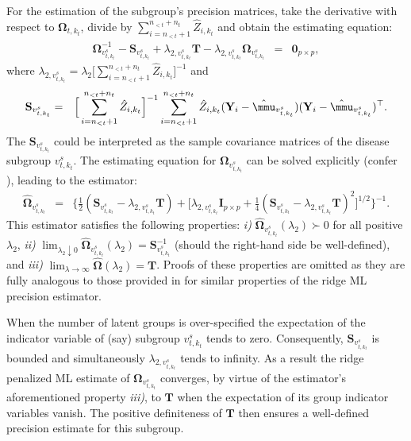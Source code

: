 \documentclass[10pt]{article}
\begin{document}
For the estimation of the subgroup's precision matrices, take the derivative with respect to $\mathbf{\Omega}_{t,k_t}$, divide by $\sum_{i=n_{<t} + 1}^{n_{<t} + n_t} \hat{Z}_{i, k_t} $ and obtain the estimating equation:
\begin{eqnarray*}
\mathbf{\Omega}_{v_{t, k_t}^s}^{-1} - \mathbf{S}_{v_{t, k_t}^s} + \lambda_{2, v_{t, k_t}^s} \mathbf{T} - \lambda_{2, v_{t, k_t}^s} \mathbf{\Omega}_{v_{t, k_t}^s} & = & \mathbf{0}_{p \times p},
\end{eqnarray*}
where  $\lambda_{2, v_{t, k_t}^s} = \lambda_2 \big[ \sum_{i=n_{<t} + 1}^{n_{<t} + n_t} \hat{Z}_{i, k_t}  \big]^{-1}$ and
\begin{eqnarray*}
\mathbf{S}_{v_{t, k_t}^s} & = & \Big[  \sum_{i=n_{<t} + 1}^{n_{<t} + n_t} \hat{Z}_{i, k_t}  \Big]^{-1}  \sum_{i=n_{<t} + 1}^{n_{<t} + n_t} \hat{Z}_{i, k_t}  (\mathbf{Y}_i - \hat{\mmu}_{v_{t, k_t}^s}) (\mathbf{Y}_{i} - \hat{\mmu}_{v_{t, k_t}^s})^{\top}.
\end{eqnarray*}
The $\mathbf{S}_{v_{t, k_t}^s}$ could be interpreted as the sample covariance matrices of the disease subgroup $v_{t, k_t}^s$. The estimating equation for $\mathbf{\Omega}_{v_{t, k_t}^s}$ can be solved explicitly (confer \citealp{VWie2014b}), leading to the estimator:
\begin{eqnarray}
\widehat{\mathbf{\Omega}}_{v_{t, k_t}^s} & = & \Big\{ \frac{1}{2} ( \mathbf{S}_{v_{t, k_t}^s}  - \lambda_{2, v_{t, k_t}^s} \mathbf{T} ) + \Big[\lambda_{2, v_{t, k_t}^s} \mathbf{I}_{p \times p} + \frac{1}{4} (\mathbf{S}_{v_{t, k_t}^s} - \lambda_{2,v_{t, k_t}^s} \mathbf{T})^2 \Big]^{1/2}  \Big\}^{-1}.
\label{est:omega}
\end{eqnarray}
This estimator satisfies the following properties: \textit{i)} $\widehat{\mathbf{\Omega}}_{v_{t, k_t}^s}(\lambda_2) \succ 0$ for all positive $\lambda_2$, \textit{ii)} $\lim_{\lambda_2 \downarrow 0}  \widehat{\mathbf{\Omega}}_{v_{t, k_t}^s} (\lambda_2) = \mathbf{S}_{v_{t, k_t}^s}^{-1}$ (should the right-hand side be well-defined), and \textit{iii)} $\lim_{\lambda\rightarrow \infty} \widehat{\mathbf{\Omega}}(\lambda_2)= \mathbf{T}$. Proofs of these properties are omitted as they are fully analogous to those provided in \cite{VWie2016a} for similar properties of the ridge ML precision estimator.

When the number of latent groups is over-specified the expectation of the indicator variable of (say) subgroup $v_{t, k_t}^s$ tends to zero. Consequently, $\mathbf{S}_{v_{t, k_t}^s}$ is bounded and simultaneously $\lambda_{2, v_{t, k_t}^s}$ tends to infinity. As a result the ridge penalized ML estimate of $\mathbf{\Omega}_{v_{t, k_t}^s}$ converges, by virtue of the estimator's aforementioned property \textit{iii)}, to $\mathbf{T}$ when the expectation of its group indicator variables vanish. The positive definiteness of $\mathbf{T} $ then ensures a well-defined precision estimate for this subgroup.
\end{document}
